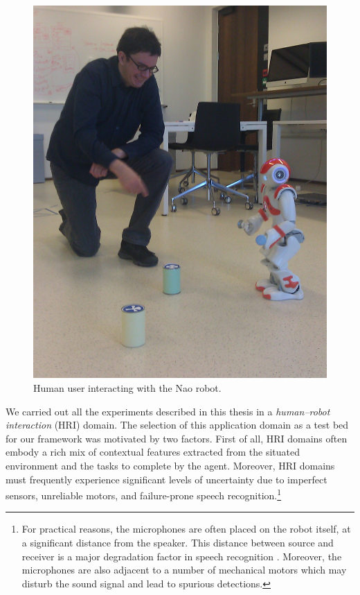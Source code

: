 \newpage

\begin{figure}
\vspace{-6mm}
\begin{center}
\includegraphics[scale=0.10]{imgs/nao1.jpg}
\end{center} 
\caption{Human user interacting with the Nao robot.}
\label{fig:nao}
\end{figure}

We carried out all the experiments described in this thesis in a \textit{human--robot interaction}  (HRI) domain.  The selection of this application domain as a test bed for our framework was motivated by two factors.  First of all, HRI domains often embody a rich mix of contextual features extracted from the situated environment and the tasks to complete by the agent. Moreover, HRI domains must frequently experience significant levels of uncertainty due to imperfect sensors, unreliable motors, and failure-prone speech recognition.\footnote{For practical reasons, the microphones are often placed on the robot itself, at a significant distance from the speaker.  This distance between source and receiver is a major degradation factor in speech recognition \citep{wolfel2009distant}.  Moreover, the microphones are also adjacent to a number of mechanical motors which may disturb the sound signal and lead to spurious detections.}

